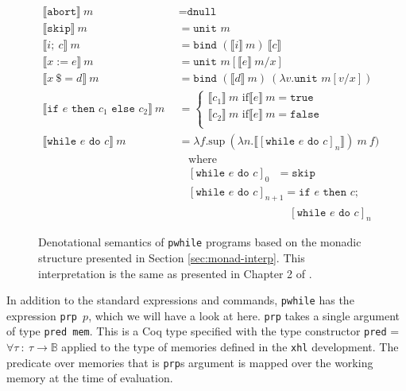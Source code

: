 \documentclass[11pt, leqno, titlepage]{article}
\theoremstyle{definition}
\begin{document}
\begin{figure}[h]
  \begin{align*}
    \llbracket \texttt{abort} \rrbracket~m
    &~~= \texttt{dnull}\\
    \llbracket \texttt{skip} \rrbracket~m
    &~~= \texttt{unit }m\\
    \llbracket i;~c \rrbracket~m
    &~~= \texttt{bind }(\llbracket i \rrbracket~m) ~
      \llbracket c \rrbracket \\
    \llbracket x := e \rrbracket~m
    &~~= \texttt{unit }m [\llbracket e \rrbracket~m / x]\\
    \llbracket x~\$= d \rrbracket~m
    &~~= \texttt{bind } (\llbracket d \rrbracket~m) ~(\lambda v.\texttt{unit }m[v/x])
    \\ 
    \llbracket \texttt{if $e$ then $c_1$ else $c_2$} \rrbracket~m
    &~~= \begin{cases} \llbracket c_1 \rrbracket~m\text{ if} \llbracket e
           \rrbracket~m = \texttt{true}\\ 
           \llbracket c_2 \rrbracket~m\text{ if} \llbracket e \rrbracket~m =
           \texttt{false}\\ 
         \end{cases}\\
    \llbracket \texttt{while $e$ do $c$} \rrbracket~m
    &~~= \lambda f.\text{sup}~(\lambda n. \llbracket [\texttt{while $e$ do }c]_n
      \rrbracket)~ m~f)\\
    & ~~~~~~ \text{where}\\
    & ~~~~~~ [\texttt{while $e$ do }c]_0 ~~~ = \texttt{skip}\\
    & ~~~~~~ [\texttt{while $e$ do }c]_{n+1} = \texttt{if $e$ then $c$;} \\
    & \hspace{125pt}[\texttt{while $e$ do }c]_n
  \end{align*}
  \caption{Denotational semantics of \texttt{pwhile} programs based on the monadic
    structure presented in Section \ref{sec:monad-interp}. This interpretation is the
    same as presented in Chapter 2 of \cite{zanella}.}
  \label{fig:pwhile-sem}
\end{figure}


In addition to the standard expressions and commands, \texttt{pwhile} has the
expression \texttt{prp $p$}, which we will have a look at here.
\texttt{prp} takes a single argument of type \texttt{pred mem}. This is a Coq type
specified with the type constructor \texttt{pred} = $\forall \tau~:~\tau \to
\mathbb{B}$ applied to the type of memories defined in the \texttt{xhl}
development. The predicate over memories that is \texttt{prp}s argument is mapped
over the working memory at the time of evaluation.
\end{document}
